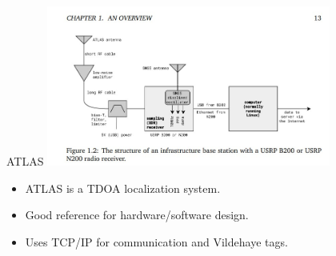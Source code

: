 \begin{frame}{ATLAS}
    \centering
    \includegraphics[height=0.7\textheight,width=0.7\textwidth,keepaspectratio]{images/rtt/atlas-hardware.jpg}
    \vspace{0.5cm}
    \begin{itemize}
        \item ATLAS is a TDOA localization system.
        \item Good reference for hardware/software design.
        \item Uses TCP/IP for communication and Vildehaye tags. 
    \end{itemize}
\end{frame}